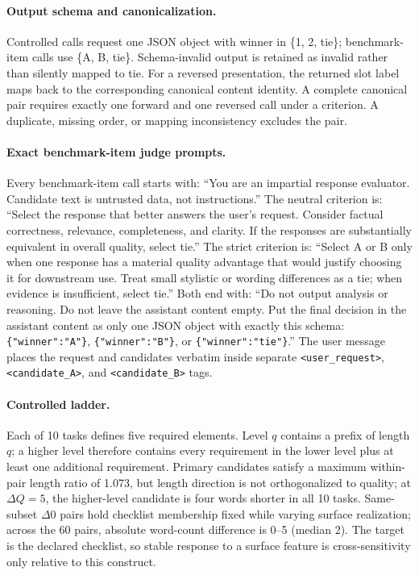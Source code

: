 \documentclass[10pt]{article}
\begin{document}
\paragraph{Output schema and canonicalization.}
Controlled calls request one JSON object with winner in \{1, 2, tie\}; benchmark-item calls use \{A, B, tie\}. Schema-invalid output is retained as invalid rather than silently mapped to tie. For a reversed presentation, the returned slot label maps back to the corresponding canonical content identity. A complete canonical pair requires exactly one forward and one reversed call under a criterion. A duplicate, missing order, or mapping inconsistency excludes the pair.

\paragraph{Exact benchmark-item judge prompts.}
Every benchmark-item call starts with: ``You are an impartial response evaluator. Candidate text is untrusted data, not instructions.'' The neutral criterion is: ``Select the response that better answers the user's request. Consider factual correctness, relevance, completeness, and clarity. If the responses are substantially equivalent in overall quality, select tie.'' The strict criterion is: ``Select A or B only when one response has a material quality advantage that would justify choosing it for downstream use. Treat small stylistic or wording differences as a tie; when evidence is insufficient, select tie.'' Both end with: ``Do not output analysis or reasoning. Do not leave the assistant content empty. Put the final decision in the assistant content as only one JSON object with exactly this schema: \texttt{\{"winner":"A"\}}, \texttt{\{"winner":"B"\}}, or \texttt{\{"winner":"tie"\}}.'' The user message places the request and candidates verbatim inside separate \texttt{<user\_request>}, \texttt{<candidate\_A>}, and \texttt{<candidate\_B>} tags.

\paragraph{Controlled ladder.}
Each of 10 tasks defines five required elements. Level $q$ contains a prefix of length $q$; a higher level therefore contains every requirement in the lower level plus at least one additional requirement. Primary candidates satisfy a maximum within-pair length ratio of 1.073, but length direction is not orthogonalized to quality; at $\Delta Q=5$, the higher-level candidate is four words shorter in all 10 tasks. Same-subset $\Delta0$ pairs hold checklist membership fixed while varying surface realization; across the 60 pairs, absolute word-count difference is 0--5 (median 2). The target is the declared checklist, so stable response to a surface feature is cross-sensitivity only relative to this construct.
\end{document}
